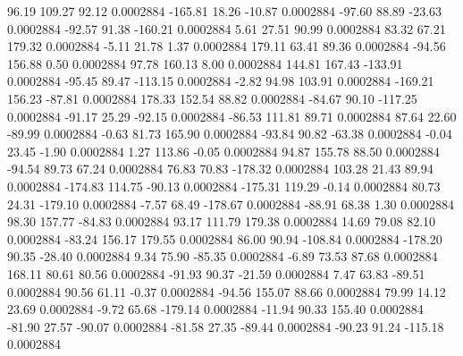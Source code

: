        96.19      109.27       92.12     0.0002884
     -165.81       18.26      -10.87     0.0002884
      -97.60       88.89      -23.63     0.0002884
      -92.57       91.38     -160.21     0.0002884
        5.61       27.51       90.99     0.0002884
       83.32       67.21      179.32     0.0002884
       -5.11       21.78        1.37     0.0002884
      179.11       63.41       89.36     0.0002884
      -94.56      156.88        0.50     0.0002884
       97.78      160.13        8.00     0.0002884
      144.81      167.43     -133.91     0.0002884
      -95.45       89.47     -113.15     0.0002884
       -2.82       94.98      103.91     0.0002884
     -169.21      156.23      -87.81     0.0002884
      178.33      152.54       88.82     0.0002884
      -84.67       90.10     -117.25     0.0002884
      -91.17       25.29      -92.15     0.0002884
      -86.53      111.81       89.71     0.0002884
       87.64       22.60      -89.99     0.0002884
       -0.63       81.73      165.90     0.0002884
      -93.84       90.82      -63.38     0.0002884
       -0.04       23.45       -1.90     0.0002884
        1.27      113.86       -0.05     0.0002884
       94.87      155.78       88.50     0.0002884
      -94.54       89.73       67.24     0.0002884
       76.83       70.83     -178.32     0.0002884
      103.28       21.43       89.94     0.0002884
     -174.83      114.75      -90.13     0.0002884
     -175.31      119.29       -0.14     0.0002884
       80.73       24.31     -179.10     0.0002884
       -7.57       68.49     -178.67     0.0002884
      -88.91       68.38        1.30     0.0002884
       98.30      157.77      -84.83     0.0002884
       93.17      111.79      179.38     0.0002884
       14.69       79.08       82.10     0.0002884
      -83.24      156.17      179.55     0.0002884
       86.00       90.94     -108.84     0.0002884
     -178.20       90.35      -28.40     0.0002884
        9.34       75.90      -85.35     0.0002884
       -6.89       73.53       87.68     0.0002884
      168.11       80.61       80.56     0.0002884
      -91.93       90.37      -21.59     0.0002884
        7.47       63.83      -89.51     0.0002884
       90.56       61.11       -0.37     0.0002884
      -94.56      155.07       88.66     0.0002884
       79.99       14.12       23.69     0.0002884
       -9.72       65.68     -179.14     0.0002884
      -11.94       90.33      155.40     0.0002884
      -81.90       27.57      -90.07     0.0002884
      -81.58       27.35      -89.44     0.0002884
      -90.23       91.24     -115.18     0.0002884
